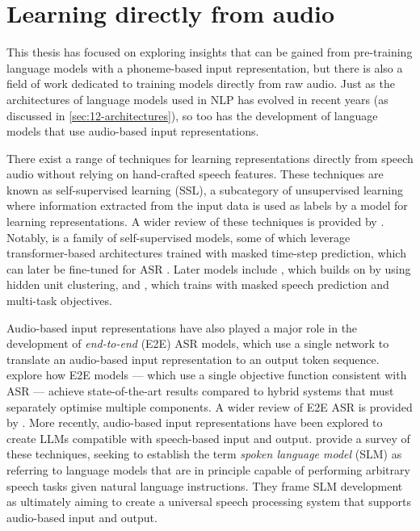 
\section{Learning directly from audio}
\label{sec:17-audiomodels}

This thesis has focused on exploring insights that can be gained from pre-training language models with a phoneme-based input representation, but there is also a field of work dedicated to training models directly from raw audio. Just as the architectures of language models used in NLP has evolved in recent years (as discussed in \cref{sec:12-architectures}), so too has the development of language models that use audio-based input representations.

There exist a range of techniques for learning representations directly from speech audio without relying on hand-crafted speech features. These techniques are known as self-supervised learning (SSL), a subcategory of unsupervised learning where information extracted from the input data is used as labels by a model for learning representations. A wider review of these techniques is provided by \citet{mohamed2022self}. Notably,  is a family of self-supervised models, some of which leverage transformer-based architectures trained with masked time-step prediction, which can later be fine-tuned for ASR \citep{baevski2020wav2vec}. Later models include  \citep{hsu-2021-hubert}, which builds on  by using hidden unit clustering, and  \citep{chen2022wavlm}, which trains with masked speech prediction and multi-task objectives.

Audio-based input representations have also played a major role in the development of \emph{end-to-end} (E2E) ASR models, which use a single network to translate an audio-based input representation to an output token sequence. \citet{li2022recent} explore how E2E models --- which use a single objective function consistent with ASR --- achieve state-of-the-art results compared to hybrid systems that must separately optimise multiple components. A wider review of E2E ASR is provided by \citet{prabhavalkar2023end}. More recently, audio-based input representations have been explored to create LLMs compatible with speech-based input and output. \citet{arora2025landscapespokenlanguagemodels} provide a survey of these techniques, seeking to establish the term \emph{spoken language model} (SLM) as referring to language models that are in principle capable of performing arbitrary speech tasks given natural language instructions. They frame SLM development as ultimately aiming to create a universal speech processing system that supports audio-based input and output.

